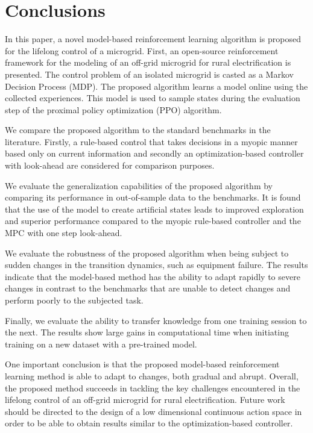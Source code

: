 \documentclass{article}
\begin{document}
\section{Conclusions} \label{sec: conclusions}
    In this paper, a novel model-based reinforcement learning algorithm is proposed for the lifelong control of a microgrid. First, an open-source reinforcement framework for the modeling of an off-grid microgrid for rural electrification is presented. The control problem of an isolated microgrid is casted as a Markov Decision Process (MDP). The proposed algorithm learns a model online using the collected experiences. This model is used to sample states during the evaluation step of the proximal policy optimization (PPO) algorithm.
    
    We compare the proposed algorithm to the standard benchmarks in the literature. Firstly, a rule-based control that takes decisions in a myopic manner based only on current information and secondly an optimization-based controller with look-ahead are considered for comparison purposes.
    
    We evaluate the generalization capabilities of the proposed algorithm by comparing its performance in out-of-sample data to the benchmarks. It is found that the use of the model to create artificial states leads to improved exploration and superior performance compared to the myopic rule-based controller and the MPC with one step look-ahead.
    
    We evaluate the robustness of the proposed algorithm when being subject to sudden changes in the transition dynamics, such as equipment failure. The results indicate that the model-based method has the ability to adapt rapidly to severe changes in contrast to the benchmarks that are unable to detect changes and perform poorly to the subjected task.
    
    Finally, we evaluate the ability to transfer knowledge from one training session to the next. The results show large gains in computational time when initiating training on a new dataset with a pre-trained model.

	One important conclusion is that the proposed model-based reinforcement learning method is able to adapt to changes, both gradual and abrupt. Overall, the proposed method succeeds in tackling the key challenges encountered in the lifelong control of an off-grid microgrid for rural electrification. Future work should be directed to the design of a low dimensional continuous action space in order to be able to obtain results similar to the optimization-based controller.
    
\end{document}
